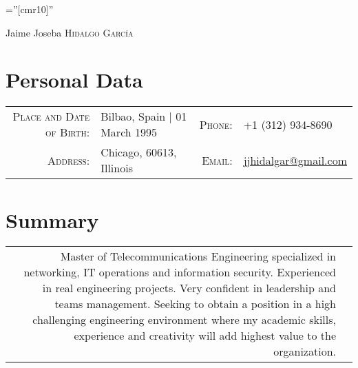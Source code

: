 \documentclass[a4paper,10pt]{article}
\begin{document}

\pagestyle{empty} %

\font\fb=''[cmr10]'' %

\par{\centering
		{\Huge Jaime Joseba \textsc{Hidalgo García}
	}\bigskip\par}

\section{Personal Data}

\begin{tabular}{rp{6.0cm}rp{6.0cm}}
    \textsc{Place and Date of Birth:} & Bilbao, Spain  | 01 March 1995 & \hfill \textsc{Phone:}   & +1 (312) 934-8690\\
    \textsc{Address:}   &  Chicago, 60613, Illinois & \textsc{Email:}     & \href{mailto:jjhidalgar@gmail.com}{jjhidalgar@gmail.com}
\end{tabular}


\section{Summary}
\begin{tabular}{rp{13.6cm}}
  \begin{minipage}[t]{1\columnwidth}%
  Master of Telecommunications Engineering specialized in networking, IT operations and information security. Experienced in real engineering projects. Very confident in leadership and teams management. Seeking to obtain a position in a high challenging engineering environment where my academic skills, experience and creativity will add highest value to the organization.
    \end{minipage}\tabularnewline
\end{tabular}
\end{document}
